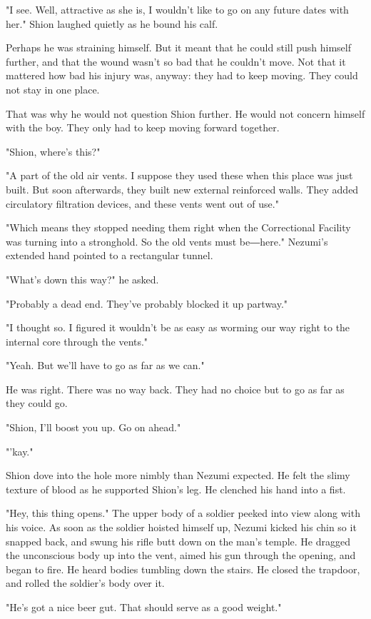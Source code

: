 "I see. Well, attractive as she is, I wouldn't like to go on any future
dates with her." Shion laughed quietly as he bound his calf.

Perhaps he was straining himself. But it meant that he could still push
himself further, and that the wound wasn't so bad that he couldn't move.
Not that it mattered how bad his injury was, anyway: they had to keep
moving. They could not stay in one place.

That was why he would not question Shion further. He would not concern
himself with the boy. They only had to keep moving forward together.

"Shion, where's this?"

"A part of the old air vents. I suppose they used these when this place
was just built. But soon afterwards, they built new external reinforced
walls. They added circulatory filtration devices, and these vents went
out of use."

"Which means they stopped needing them right when the Correctional
Facility was turning into a stronghold. So the old vents must be―here."
Nezumi's extended hand pointed to a rectangular tunnel.

"What's down this way?" he asked.

"Probably a dead end. They've probably blocked it up partway."

"I thought so. I figured it wouldn't be as easy as worming our way right
to the internal core through the vents."

"Yeah. But we'll have to go as far as we can."

He was right. There was no way back. They had no choice but to go as far
as they could go.

"Shion, I'll boost you up. Go on ahead."

"'kay."

Shion dove into the hole more nimbly than Nezumi expected. He felt the
slimy texture of blood as he supported Shion's leg. He clenched his hand
into a fist.

"Hey, this thing opens." The upper body of a soldier peeked into view
along with his voice. As soon as the soldier hoisted himself up, Nezumi
kicked his chin so it snapped back, and swung his rifle butt down on the
man's temple. He dragged the unconscious body up into the vent, aimed
his gun through the opening, and began to fire. He heard bodies tumbling
down the stairs. He closed the trapdoor, and rolled the soldier's body
over it.

"He's got a nice beer gut. That should serve as a good weight."~

